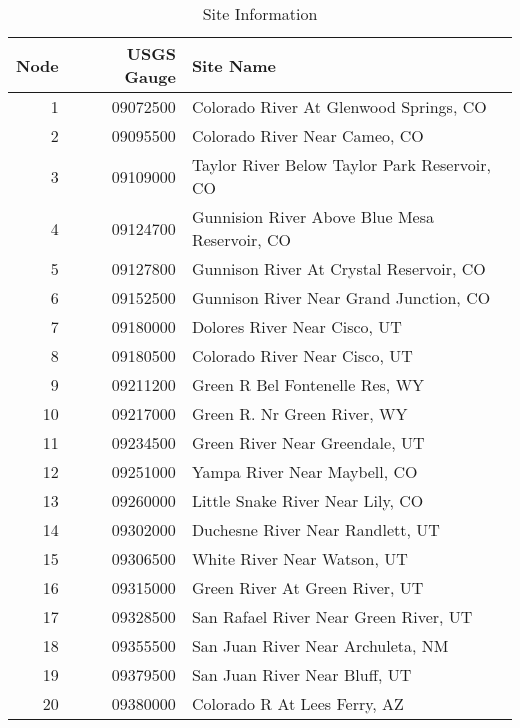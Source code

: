 \documentclass[final,5p,times,twocolumn,authoryear]{elsarticle}
\begin{document}
\begin{table}[ht]
\begin{center}
\begin{tabular}{rrp{5cm}}
  \toprule
 Node & USGS Gauge & Site Name \\ 
  \midrule
  1  & 09072500 &  Colorado River At Glenwood Springs, CO        \\ 
  2  & 09095500 &  Colorado River Near Cameo, CO                 \\ 
  3  & 09109000 &  Taylor River Below Taylor Park Reservoir, CO  \\ 
  4  & 09124700 &  Gunnision River Above Blue Mesa Reservoir, CO \\ 
  5  & 09127800 &  Gunnison River At Crystal Reservoir, CO       \\ 
  6  & 09152500 &  Gunnison River Near Grand Junction, CO        \\ 
  7  & 09180000 &  Dolores River Near Cisco, UT                  \\ 
  8  & 09180500 &  Colorado River Near Cisco, UT                 \\ 
  9  & 09211200 &  Green R Bel Fontenelle Res, WY                \\ 
  10 & 09217000 &  Green R. Nr Green River, WY                   \\ 
  11 & 09234500 &  Green River Near Greendale, UT                \\ 
  12 & 09251000 &  Yampa River Near Maybell, CO                  \\ 
  13 & 09260000 &  Little Snake River Near Lily, CO              \\ 
  14 & 09302000 &  Duchesne River Near Randlett, UT              \\ 
  15 & 09306500 &  White River Near Watson, UT                   \\ 
  16 & 09315000 &  Green River At Green River, UT                \\ 
  17 & 09328500 &  San Rafael River Near Green River, UT         \\ 
  18 & 09355500 &  San Juan River Near Archuleta, NM             \\ 
  19 & 09379500 &  San Juan River Near Bluff, UT                 \\ 
  20 & 09380000 &  Colorado R At Lees Ferry, AZ                  \\ 
   \bottomrule
\end{tabular}
\caption{Site Information}
\end{center}
\end{table}
\end{document}
